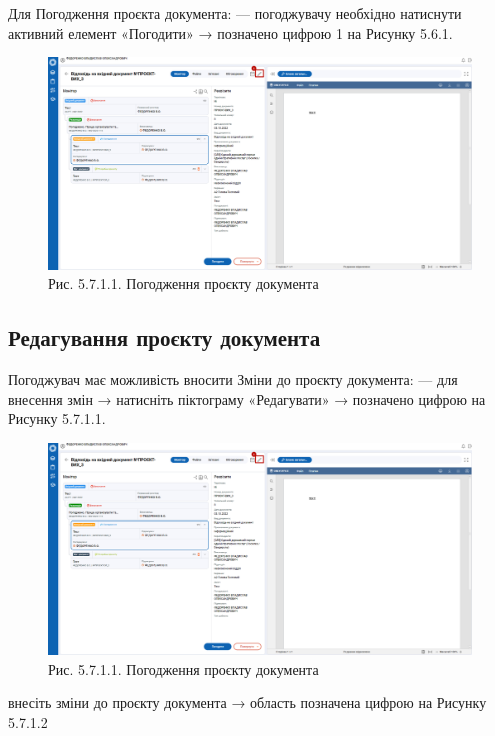 Для Погодження проєкта документа:
--- погоджувачу необхідно натиснути активний елемент «Погодити» →
позначено цифрою 1 на Рисунку 5.6.1.

\begin{figure}[!htbp]
\centerline{\includegraphics[width=\textwidth]{img/5.7.1.1.png}}
\caption{Рис. 5.7.1.1. Погодження проєкту документа}
\end{figure}

\subsection{Редагування проєкту документа}

Погоджувач має можливість вносити Зміни до проєкту документа:
--- для внесення змін → натисніть піктограму «Редагувати» → позначено
цифрою  на Рисунку 5.7.1.1.

\begin{figure}[!htbp]
\centerline{\includegraphics[width=\textwidth]{img/5.7.1.1.png}}
\caption{Рис. 5.7.1.1. Погодження проєкту документа}
\end{figure}

внесіть зміни до проєкту документа → область позначена цифрою  на Рисунку 5.7.1.2

